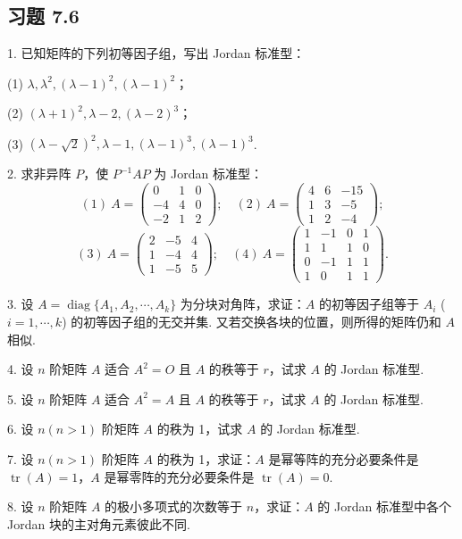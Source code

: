 \documentclass[UTF8,12pt,a4paper,fontset=fandol]{ctexart}
\begin{document}
\subsection*{习题 7.6}

1. 已知矩阵的下列初等因子组，写出 Jordan 标准型：

(1) $\lambda,\lambda^2,(\lambda-1)^2,(\lambda-1)^2$；

(2) $(\lambda+1)^2,\lambda-2,(\lambda-2)^3$；

(3) $(\lambda-\sqrt{2})^2,\lambda-1,(\lambda-1)^3,(\lambda-1)^3$.

2. 求非异阵 $P$，使 $P^{-1}AP$ 为 Jordan 标准型：
\[
(1)\ A=\left(\begin{array}{ccc}
0 & 1 & 0\\
-4 & 4 & 0\\
-2 & 1 & 2
\end{array}\right);\quad
(2)\ A=\left(\begin{array}{ccc}
4 & 6 & -15\\
1 & 3 & -5\\
1 & 2 & -4
\end{array}\right);
\]
\[
(3)\ A=\left(\begin{array}{ccc}
2 & -5 & 4\\
1 & -4 & 4\\
1 & -5 & 5
\end{array}\right);\quad
(4)\ A=\left(\begin{array}{cccc}
1 & -1 & 0 & 1\\
1 & 1 & 1 & 0\\
0 & -1 & 1 & 1\\
1 & 0 & 1 & 1
\end{array}\right).
\]

3. 设 $A=\operatorname{diag}\{A_1,A_2,\cdots,A_k\}$ 为分块对角阵，求证：$A$ 的初等因子组等于 $A_i$ ($i=1,\cdots,k$) 的初等因子组的无交并集. 又若交换各块的位置，则所得的矩阵仍和 $A$ 相似.

4. 设 $n$ 阶矩阵 $A$ 适合 $A^2=O$ 且 $A$ 的秩等于 $r$，试求 $A$ 的 Jordan 标准型.

5. 设 $n$ 阶矩阵 $A$ 适合 $A^2=A$ 且 $A$ 的秩等于 $r$，试求 $A$ 的 Jordan 标准型.

6. 设 $n(n>1)$ 阶矩阵 $A$ 的秩为 1，试求 $A$ 的 Jordan 标准型.

7. 设 $n(n>1)$ 阶矩阵 $A$ 的秩为 1，求证：$A$ 是幂等阵的充分必要条件是 $\operatorname{tr}(A)=1$，$A$ 是幂零阵的充分必要条件是 $\operatorname{tr}(A)=0$.

8. 设 $n$ 阶矩阵 $A$ 的极小多项式的次数等于 $n$，求证：$A$ 的 Jordan 标准型中各个 Jordan 块的主对角元素彼此不同.
\end{document}
